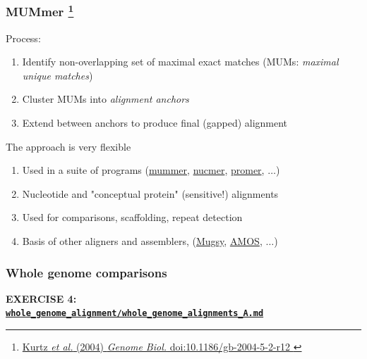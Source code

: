 %
\begin{frame}
  \frametitle{MUMmer
  \footnote{\tiny{\href{http://dx.doi.org/10.1186/gb-2004-5-2-r12
}{Kurtz \textit{et al.} (2004) \textit{Genome Biol.} doi:10.1186/gb-2004-5-2-r12
}}}
  }
  \textcolor{RawSienna}{Process:}
  \begin{enumerate}
    \item \textcolor{hutton_green}{Identify non-overlapping set of maximal exact matches (MUMs: \textit{maximal unique matches})}
    \item \textcolor{hutton_blue}{Cluster MUMs into \textit{alignment anchors}}
    \item \textcolor{hutton_purple}{Extend between anchors to produce final (gapped) alignment}    
  \end{enumerate}
  \textcolor{RawSienna}{The approach is very flexible}
  \begin{enumerate}
    \item Used in a suite of programs (\url{mummer}, \url{nucmer}, \url{promer}, $\ldots$)
    \item Nucleotide and "conceptual protein" (sensitive!) alignments
    \item Used for comparisons, scaffolding, repeat detection
    \item Basis of other aligners and assemblers, (\url{Mugsy}, \url{AMOS}, $\ldots$)
  \end{enumerate}
\end{frame}

%
\begin{frame}
  \frametitle{Whole genome comparisons}
  \Large{
    \textcolor{hutton_blue}{
      \textbf{
      EXERCISE 4: \\
      {\small \href{https://github.com/widdowquinn/Teaching-2015-03-17-UoD_compgenvis/blob/master/exercises/whole_genome_alignment/whole_genome_alignments_A.md}{\texttt{whole\_genome\_alignment/whole\_genome\_alignments\_A.md}}}
      }
    }
  }
\end{frame}

